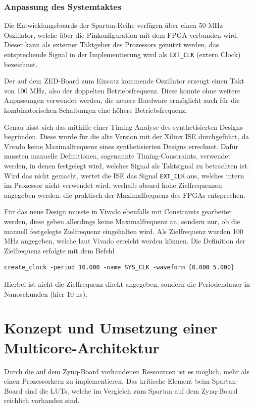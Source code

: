 \documentclass[11pt,a4paper,titlepage]{article}
\begin{document}
\subsubsection{Anpassung des Systemtaktes}

Die Entwicklungsboards der Spartan-Reihe verfügen über einen 50 MHz Oszillator, welche über die Pinkonfiguration mit dem FPGA verbunden wird. Dieser kann als externer Taktgeber des Prozessors genutzt werden, das entsprechende Signal in der Implementierung wird als \verb+EXT_CLK+ (extern Clock) bezeichnet.

Der auf dem ZED-Board zum Einsatz kommende Oszillator erzeugt einen Takt von 100 MHz, also der doppelten Betriebsfrequenz. Diese konnte ohne weitere Anpassungen verwendet werden, die neuere Hardware ermöglicht auch für die kombinatorischen Schaltungen eine höhere Betriebsfrequenz.

Genau lässt sich das mithilfe einer Timing-Analyse des synthetisierten Designs begründen. Diese wurde für die alte Version mit der Xilinx ISE durchgeführt, da Vivado keine Maximalfrequenz eines synthetisierten Designs errechnet. Dafür mussten manuelle Definitionen, sogenannte Timing-Constraints, verwendet werden, in denen festgelegt wird, welches Signal als Taktsignal zu betrachten ist. Wird das nicht gemacht, wertet die ISE das Signal \verb+EXT_CLK+ aus, welches intern im Prozessor nicht verwendet wird, weshalb absurd hohe Zielfrequenzen angegeben werden, die praktisch der Maximalfrequenz des FPGAs entsprechen. 

Für das neue Design musste in Vivado ebenfalls mit Constraints gearbeitet werden, diese geben allerdings keine Maximalfrequenz an, sondern nur, ob die manuell festgelegte Zielfrequenz eingehalten wird. Als Zielfrequenz wurden 100 MHz angegeben, welche laut Vivado erreicht werden können. Die Definition der Zielfrequenz erfolgte mit dem Befehl
\begin{verbatim}
create_clock -period 10.000 -name SYS_CLK -waveform {0.000 5.000}
\end{verbatim}
Hierbei ist nicht die Zielfrequenz direkt angegeben, sondern die Periodendauer in Nanosekunden (hier 10 ns).

\newpage
\section{Konzept und Umsetzung einer Multicore-Architektur}

Durch die auf dem Zynq-Board vorhandenen Ressourcen ist es möglich, mehr als einen Prozessorkern zu implementieren. Das kritische Element beim Spartan-Board sind die LUTs, welche im Vergleich zum Spartan auf dem Zynq-Board reichlich vorhanden sind. 
\end{document}
